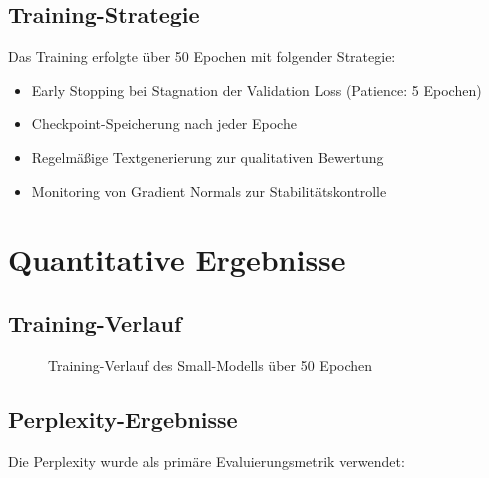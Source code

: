 \subsection{Training-Strategie}

Das Training erfolgte über 50 Epochen mit folgender Strategie:
\begin{itemize}
    \item Early Stopping bei Stagnation der Validation Loss (Patience: 5 Epochen)
    \item Checkpoint-Speicherung nach jeder Epoche
    \item Regelmäßige Textgenerierung zur qualitativen Bewertung
    \item Monitoring von Gradient Normals zur Stabilitätskontrolle
\end{itemize}

\section{Quantitative Ergebnisse}

\subsection{Training-Verlauf}

\begin{figure}[h]
\centering
{}
\caption{Training-Verlauf des Small-Modells über 50 Epochen}
\label{fig:training_curves}
\end{figure}

\subsection{Perplexity-Ergebnisse}

Die Perplexity wurde als primäre Evaluierungsmetrik verwendet:

